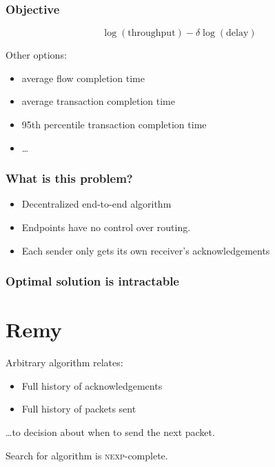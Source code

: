 \documentclass[svgnames]{beamer}
\newcommand{\ssline}{\vspace{8 pt}}
\begin{document}
\begin{frame}
\frametitle{Objective}

$$\log(\textrm{throughput}) - \delta \log(\textrm{delay})$$

Other options:

\begin{itemize}

\item average flow completion time

\item average transaction completion time

\item 95th percentile transaction completion time

\item \ldots

\end{itemize}

\end{frame}

\begin{frame}
\frametitle{What is this problem?}

\begin{itemize}

\item Decentralized end-to-end algorithm

\item Endpoints have no control over routing.

\item Each sender only gets its own receiver's acknowledgements

\end{itemize}

\end{frame}

\begin{frame}
\frametitle{Optimal solution is intractable}

\section{Remy}

Arbitrary algorithm relates:

\begin{itemize}

\item Full history of acknowledgements

\item Full history of packets sent

\end{itemize}

\ldots to decision about when to send the next packet.

\ssline

Search for algorithm is \textsc{nexp}-complete.

\end{frame}
\end{document}
